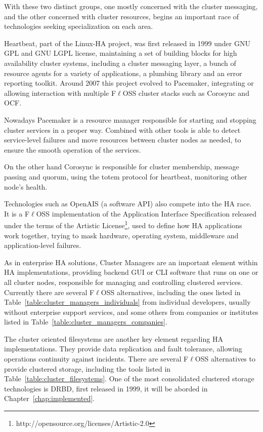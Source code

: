 \documentclass[a4paper, 12pt]{book}
\begin{document}
\noindent With these two distinct groups, one mostly concerned with the cluster messaging, and the other concerned with cluster resources, begins an important race of technologies seeking specialization on each area.\bigskip

\noindent Heartbeat, part of the Linux-HA project, was first released in 1999 under GNU GPL and GNU LGPL license, maintaining a set of building blocks for high availability cluster systems, including a cluster messaging layer, a bunch of resource agents for a variety of applications, a plumbing library and an error reporting toolkit. Around 2007 this project evolved to Pacemaker, integrating or allowing interaction with multiple F$\ell$OSS cluster stacks such as Corosync and OCF.\bigskip

\noindent Nowadays Pacemaker is a resource manager responsible for starting and stopping cluster services in a proper way. Combined with other tools is able to detect service-level failures and move resources between cluster nodes as needed, to ensure the smooth operation of the services.\bigskip


\noindent On the other hand Corosync is responsible for cluster membership, message passing and quorum, using the totem protocol 
for heartbeat, monitoring other node's health.

\noindent Technologies such as OpenAIS (a software API) also compete into the HA race. It is a F$\ell$OSS implementation of the Application Interface Specification released under the terms of the Artistic License\footnote{ http://opensource.org/licenses/Artistic-2.0}, used to define how HA applications work together, trying to mask hardware, operating system, middleware and application-level failures. %

\noindent As in enterprise HA solutions, Cluster Managers are an important element within HA implementations, providing backend GUI or CLI software that runs on one or all cluster nodes, responsible for managing and controlling clustered services. Currently there are several F$\ell$OSS alternatives, including the ones listed in Table~\ref{table:cluster_managers_individuals} from individual developers, usually without enterprise support services, and some others from companies or institutes listed in Table~\ref{table:cluster_managers_companies}.

\noindent The cluster oriented filesystems are another key element regarding HA implementations. They provide data replication and fault tolerance, allowing operations continuity against incidents. There are several F$\ell$OSS alternatives to provide clustered storage, including the tools listed in Table~\ref{table:cluster_filesystems}. One of the most consolidated clustered storage technologies is DRBD, first released in 1999, it will be aborded in Chapter~\ref{chap:implemented}.
\end{document}
